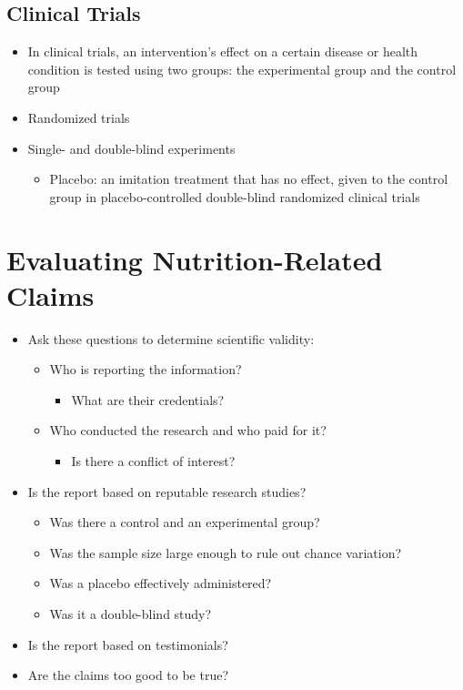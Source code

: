 \documentclass[title={Chapter 1}]{fdsn201notes}
\begin{document}
\subsection{Clinical Trials}\label{subsec:clinical-trials}
\begin{itemize}
	\item In clinical trials, an intervention's effect on a certain disease or health condition is tested using two groups: the experimental group and the control group
	\item Randomized trials
	\item Single- and double-blind experiments
	\begin{itemize}
		\item Placebo: an imitation treatment that has no effect, given to the control group in placebo-controlled double-blind randomized clinical trials
	\end{itemize}
\end{itemize}

\section{Evaluating Nutrition-Related Claims}\label{sec:evaluating-nutrition-related-claims}
\begin{itemize}
	\item Ask these questions to determine scientific validity:
	\begin{itemize}
		\item Who is reporting the information?
		\begin{itemize}
			\item What are their credentials?
		\end{itemize}
		\item Who conducted the research and who paid for it?
		\begin{itemize}
			\item Is there a conflict of interest?
		\end{itemize}
	\end{itemize}
	\item Is the report based on reputable research studies?
	\begin{itemize}
		\item Was there a control and an experimental group?
		\item Was the sample size large enough to rule out chance variation?
		\item Was a placebo effectively administered?
		\item Was it a double-blind study?
	\end{itemize}
	\item Is the report based on testimonials?
	\item Are the claims too good to be true?
\end{itemize}
\end{document}
